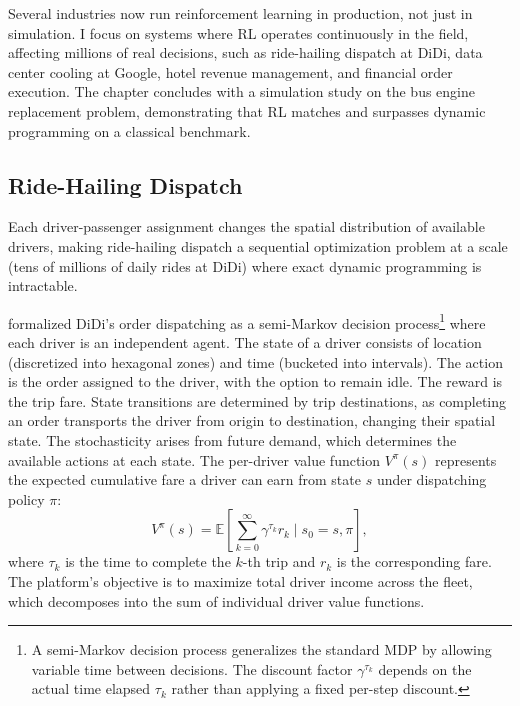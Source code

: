 
Several industries now run reinforcement learning in production, not just in simulation. I focus on systems where RL operates continuously in the field, affecting millions of real decisions, such as ride-hailing dispatch at DiDi, data center cooling at Google, hotel revenue management, and financial order execution. The chapter concludes with a simulation study on the bus engine replacement problem, demonstrating that RL matches and surpasses dynamic programming on a classical benchmark.

\subsection{Ride-Hailing Dispatch}
\label{sec:ridehailing}

Each driver-passenger assignment changes the spatial distribution of available drivers, making ride-hailing dispatch a sequential optimization problem at a scale (tens of millions of daily rides at DiDi) where exact dynamic programming is intractable.

\citet{Qin2021dispatch} formalized DiDi's order dispatching as a semi-Markov decision process\footnote{A semi-Markov decision process generalizes the standard MDP by allowing variable time between decisions. The discount factor $\gamma^{\tau_k}$ depends on the actual time elapsed $\tau_k$ rather than applying a fixed per-step discount.} where each driver is an independent agent. The state of a driver consists of location (discretized into hexagonal zones) and time (bucketed into intervals). The action is the order assigned to the driver, with the option to remain idle. The reward is the trip fare. State transitions are determined by trip destinations, as completing an order transports the driver from origin to destination, changing their spatial state. The stochasticity arises from future demand, which determines the available actions at each state. The per-driver value function $V^{\pi}(s)$ represents the expected cumulative fare a driver can earn from state $s$ under dispatching policy $\pi$:
\begin{equation}
V^{\pi}(s) = \mathbb{E}\left[ \sum_{k=0}^{\infty} \gamma^{\tau_k} r_k \mid s_0 = s, \pi \right],
\end{equation}
where $\tau_k$ is the time to complete the $k$-th trip and $r_k$ is the corresponding fare. The platform's objective is to maximize total driver income across the fleet, which decomposes into the sum of individual driver value functions.

